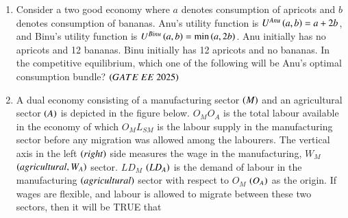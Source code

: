 \documentclass[journal,12pt,onecolumn]{IEEEtran}
\theoremstyle{remark}
\begin{document}
\begin{enumerate}
\begin{enumerate}
\end{enumerate}
\item Consider a two good economy where $a$ denotes consumption of apricots and $b$ denotes consumption of bananas. Anu's utility function is $U^{Anu} \left(a, b\right) = a + 2b$, and Binu's utility function is $U^{Binu} \left(a, b\right) = \min \left(a, 2b\right)$. Anu initially has no apricots and 12 bananas. Binu initially has 12 apricots and no bananas. In the competitive equilibrium, which one of the following will be Anu's optimal consumption bundle?
\hfill $\brak{GATE\ EE\ 2025}$
\begin{enumerate}
\end{enumerate}
\item A dual economy consisting of a manufacturing sector  $\left(M\right)$ and an agricultural sector  $\left(A\right)$ is depicted in the figure below. $O_M O_A$ is the total labour available in the economy of which $O_M L_{SM}$ is the labour supply in the manufacturing sector before any migration was allowed among the labourers. The vertical axis in the left  $\left(right\right)$ side measures the wage in the manufacturing, $W_M$  $\left(agricultural, W_A\right)$ sector. $LD_M$  $\left(LD_A\right)$ is the demand of labour in the manufacturing  $\left(agricultural\right)$ sector with respect to $O_M$  $\left(O_A\right)$ as the origin. If wages are flexible, and labour is allowed to migrate between these two sectors, then it will be TRUE that
\begin{figure}[H]

\end{figure}
\end{enumerate}
\end{document}
